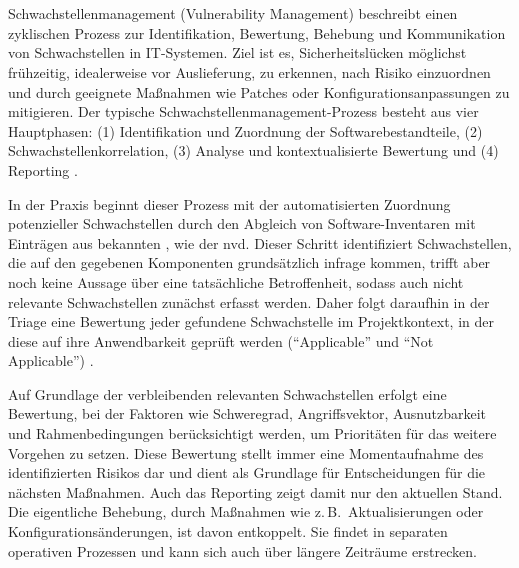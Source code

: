 

\section{}\label{sec:grundlagen-vms}

Schwachstellenmanagement (Vulnerability Management) beschreibt einen zyklischen Prozess zur Identifikation, Bewertung, Behebung und Kommunikation von Schwachstellen in IT-Systemen.
Ziel ist es, Sicherheitslücken möglichst frühzeitig, idealerweise vor Auslieferung, zu erkennen, nach Risiko einzuordnen und durch geeignete Maßnahmen wie Patches oder Konfigurationsanpassungen zu mitigieren.
Der typische Schwachstellenmanagement-Prozess besteht aus vier Hauptphasen: (1) Identifikation und Zuordnung der Softwarebestandteile, (2) Schwachstellenkorrelation, (3) Analyse und kontextualisierte Bewertung und (4) Reporting \autocite{foreman2019vulnerabilityManagement}.

In der Praxis beginnt dieser Prozess mit der automatisierten Zuordnung potenzieller Schwachstellen durch den Abgleich von Software-Inventaren mit Einträgen aus bekannten , wie der \acrshort{nvd}.
Dieser Schritt identifiziert Schwachstellen, die auf den gegebenen Komponenten grundsätzlich infrage kommen, trifft aber noch keine Aussage über eine tatsächliche Betroffenheit, sodass auch nicht relevante Schwachstellen zunächst erfasst werden.
Daher folgt daraufhin in der Triage eine Bewertung jeder gefundene Schwachstelle im Projektkontext, in der diese auf ihre Anwendbarkeit geprüft werden (\enquote{Applicable} und \enquote{Not Applicable}) \autocite{Boyens_Smith_Bartol_Winkler_Holbrook_Fallon_2024}.

Auf Grundlage der verbleibenden relevanten Schwachstellen erfolgt eine Bewertung, bei der Faktoren wie Schweregrad, Angriffsvektor, Ausnutzbarkeit und Rahmenbedingungen berücksichtigt werden, um Prioritäten für das weitere Vorgehen zu setzen.
Diese Bewertung stellt immer eine Momentaufnahme des identifizierten Risikos dar und dient als Grundlage für Entscheidungen für die nächsten Maßnahmen.
Auch das Reporting zeigt damit nur den aktuellen Stand.
Die eigentliche Behebung, durch Maßnahmen wie z.\,B.\ Aktualisierungen oder Konfigurationsänderungen, ist davon entkoppelt.
Sie findet in separaten operativen Prozessen und kann sich auch über längere Zeiträume erstrecken.

